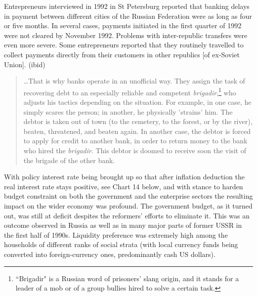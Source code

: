 Entrepreneurs interviewed in 1992 in St Petersburg reported that banking delays in payment between different cities of the Russian Federation were as long as four or five months. In several cases, payments initiated in the first quarter of 1992 were not cleared by November 1992. Problems with inter-republic transfers were even more severe. Some entrepreneurs reported that they routinely travelled to collect payments directly from their customers in other republics [of ex-Soviet Union]. (ibid) 

\begin{quote}
\dots That is why banks operate in an unofficial way. They assign the task of recovering debt to an especially reliable and competent \textit{brigadir},\footnote{``Brigadir" is a Russian word of prisoners' slang origin, and it stands for a leader of a mob or of a group bullies hired to solve a certain task.} who adjusts his tactics depending on the situation. For example, in one case, he simply scares the person; in another, he physically 'strains' him. The debtor is taken out of town (to the cemetery, to the forest, or by the river), beaten, threatened, and beaten again. In another case, the debtor is forced to apply for credit to another bank, in order to return money to the bank who hired the \textit{brigadir}. This debtor is doomed to receive soon the visit of the brigade of the other bank.~\citep[p.~69, emphasis original]{varese2001}
\end{quote}

With policy interest rate being brought up so that after inflation deduction the real interest rate stays positive, see Chart 14 below, and with stance to harden budget constraint on both the government and the enterprise sectors the resulting impact on the wider economy was profound. The government budget, as it turned out, was still at deficit despites the reformers' efforts to eliminate it. This was an outcome observed in Russia as well as in many major parts of former USSR in the first half of 1990s. Liquidity preference was extremely high among the households of different ranks of social strata (with local currency funds being converted into foreign-currency ones, predominantly cash US dollars). 

